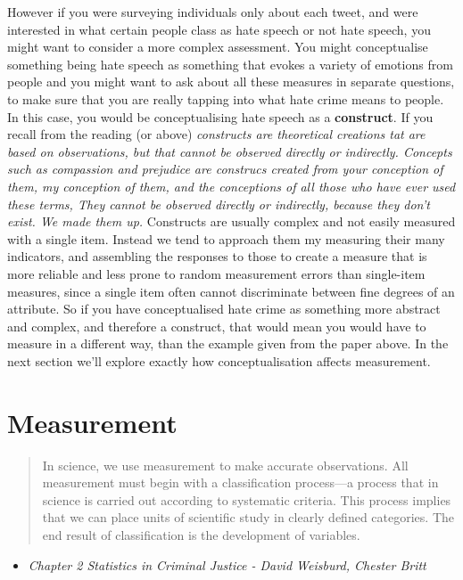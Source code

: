 \documentclass[]{book}
\providecommand{\tightlist}{%
  \setlength{\itemsep}{0pt}\setlength{\parskip}{0pt}}
\theoremstyle{definition}
\theoremstyle{definition}
\theoremstyle{definition}
\theoremstyle{remark}
\begin{document}
However if you were surveying individuals only about each tweet, and
were interested in what certain people class as hate speech or not hate
speech, you might want to consider a more complex assessment. You might
conceptualise something being hate speech as something that evokes a
variety of emotions from people and you might want to ask about all
these measures in separate questions, to make sure that you are really
tapping into what hate crime means to people. In this case, you would be
conceptualising hate speech as a \textbf{construct}. If you recall from
the reading (or above) \emph{constructs are theoretical creations tat
are based on observations, but that cannot be observed directly or
indirectly. Concepts such as compassion and prejudice are construcs
created from your conception of them, my conception of them, and the
conceptions of all those who have ever used these terms, They cannot be
observed directly or indirectly, because they don't exist. We made them
up.} Constructs are usually complex and not easily measured with a
single item. Instead we tend to approach them my measuring their many
indicators, and assembling the responses to those to create a measure
that is more reliable and less prone to random measurement errors than
single-item measures, since a single item often cannot discriminate
between fine degrees of an attribute. So if you have conceptualised hate
crime as something more abstract and complex, and therefore a construct,
that would mean you would have to measure in a different way, than the
example given from the paper above. In the next section we'll explore
exactly how conceptualisation affects measurement.

\hypertarget{measurement}{%
\section{Measurement}\label{measurement}}

\begin{quote}
In science, we use measurement to make accurate observations. All
measurement must begin with a classification process---a process that in
science is carried out according to systematic criteria. This process
implies that we can place units of scientific study in clearly defined
categories. The end result of classification is the development of
variables.
\end{quote}

\begin{itemize}
\tightlist
\item
  \emph{Chapter 2 Statistics in Criminal Justice - David Weisburd,
  Chester Britt}
\end{itemize}
\end{document}
